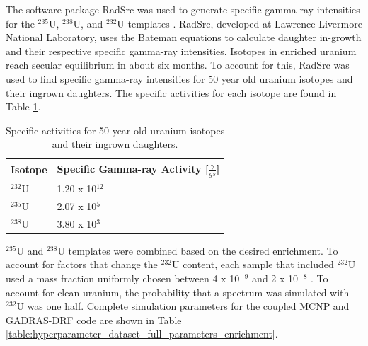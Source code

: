 The software package RadSrc was used to generate specific gamma-ray intensities for the $^{235}$U, $^{238}$U, and $^{232}$U templates \cite{Hiller2007}. RadSrc, developed at Lawrence Livermore National Laboratory, uses the Bateman equations to calculate daughter in-growth and their respective specific gamma-ray intensities. Isotopes in enriched uranium reach secular equilibrium in about six months. To account for this, RadSrc was used to find specific gamma-ray intensities for 50 year old uranium isotopes and their ingrown daughters. The specific activities for each isotope are found in Table \ref{table:specific_activities_radsrc}.

\begin{table}[H]
\centering
\caption{Specific activities for 50 year old uranium isotopes and their ingrown daughters.}
\label{table:specific_activities_radsrc}
\begin{tabular}{ll}
\hline
\textbf{Isotope} & \textbf{Specific Gamma-ray Activity [$\frac{\gamma}{g s}$]} \\ \hline
$^{232}$U & 1.20 x 10$^{12}$ \\ 
$^{235}$U & 2.07 x 10$^{5}$ \\
$^{238}$U & 3.80 x 10$^{3}$ \\ \hline
\end{tabular}
\end{table}



$^{235}$U and $^{238}$U templates were combined based on the desired enrichment. To account for factors that change the $^{232}$U content, each sample that included $^{232}$U used a mass fraction uniformly chosen between 4 x 10$^{-9}$ and 2 x 10$^{-8}$ \cite{Peurrung2019}. To account for clean uranium, the probability that a spectrum was simulated with $^{232}$U was one half. Complete simulation parameters for the coupled MCNP and GADRAS-DRF code are shown in Table \ref{table:hyperparameter_dataset_full_parameters_enrichment}.

